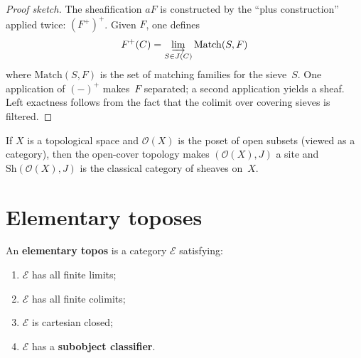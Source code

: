 \begin{proof}[Proof sketch]
The sheafification $aF$ is constructed by the ``plus construction''
applied twice: $(F^+)^+$.  Given $F$, one defines
\[
    F^+(C) = \varinjlim_{S\in J(C)} \mathrm{Match}(S, F)
\]
where $\mathrm{Match}(S,F)$ is the set of matching families for the
sieve~$S$.  One application of $(-)^+$ makes~$F$ separated; a second
application yields a sheaf.  Left exactness follows from the fact that
the colimit over covering sieves is filtered.
\end{proof}

\begin{example}\label{ex:sheaves-on-space}
If $X$ is a topological space and $\mathcal{O}(X)$ is the poset of
open subsets (viewed as a category), then the open-cover topology makes
$(\mathcal{O}(X), J)$ a site and $\mathrm{Sh}(\mathcal{O}(X), J)$ is
the classical category of sheaves on~$X$.
\end{example}



\section{Elementary toposes}\label{sec:elementary-topos}


\begin{definition}\label{def:elementary-topos}
An \textbf{elementary topos} is a category $\mathcal{E}$ satisfying:
\begin{enumerate}[label=(\roman*)]
\item $\mathcal{E}$ has all finite limits;
\item $\mathcal{E}$ has all finite colimits;
\item $\mathcal{E}$ is cartesian closed;
\item $\mathcal{E}$ has a \textbf{subobject classifier}.
\end{enumerate}
\end{definition}

